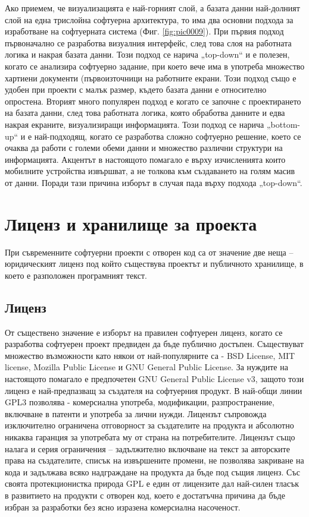 Ако приемем, че визуализацията е най-горният слой, а базата данни най-долният слой на една трислойна софтуерна архитектура, то има два основни подхода за изработване на софтуерната система (Фиг. \ref{fig:pic0009}). При първия подход първоначално се разработва визуалния интерфейс, след това слоя на работната логика и накрая базата данни. Този подход се нарича „top-down“ и е полезен, когато се анализира софтуерно задание, при което вече има в употреба множество хартиени документи (първоизточници на работните екрани. Този подход също е удобен при проекти с малък размер, където базата данни е относително опростена. Вторият много популярен подход е когато се започне с проектирането на базата данни, след това работната логика, която обработва данните и едва накрая екраните, визуализиращи информацията. Този подход се нарича „bottom-up“ и е най-подходящ, когато се разработва сложно софтуерно решение, което се очаква да работи с големи обеми данни и множество различни структури на информацията. Акцентът в настоящото помагало е върху изчисленията които мобилните устройства извършват, а не толкова към създаването на голям масив от данни. Поради тази причина изборът в случая пада върху подхода „top-down“. 

\section{Лиценз и хранилище за проекта}

При съвременните софтуерни проекти с отворен код са от значение две неща – юридическият лиценз под който съществува проектът и публичното хранилище, в което е разположен програмният текст. 

\subsection{Лиценз}

От съществено значение е изборът на правилен софтуерен лиценз, когато се разработва софтуерен проект предвиден да бъде публично достъпен. Съществуват множество възможности като някои от най-популярните са - BSD License, MIT license, Mozilla Public License и GNU General Public License. За нуждите на настоящото помагало е предпочетен GNU General Public License v3, защото този лиценз е най-предпазващ за създателя на софтуерния продукт. В най-общи линии GPL3 позволява - комерсиална употреба, модификации, разпространение, включване в патенти и употреба за лични нужди. Лицензът съпровожда изключително ограничена отговорност за създателите на продукта и абсолютно никаква гаранция за употребата му от страна на потребителите. Лицензът също налага и серия ограничения – задължително включване на текст за авторските права на създателите, списък на извършените промени, не позволява закриване на кода и задължава всяко надграждане на продукта да бъде под същия лиценз. Със своята протекционистка природа GPL е един от лицензите дал най-силен тласък в развитието на продукти с отворен код, което е достатъчна причина да бъде избран за разработки без ясно изразена комерсиална насоченост. 

